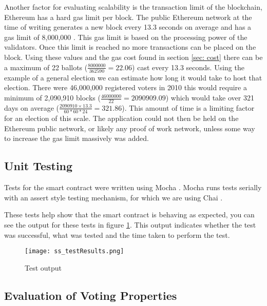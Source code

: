 \documentclass{entcs}
\begin{document}
Another factor for evaluating scalability is the transaction limit of the blockchain, Ethereum has a hard gas limit per block. The public Ethereum network at the time of writing generates a new block every 13.3 seconds on average \cite{ethscan} and has a gas limit of 8,000,000 \cite{gaslimit}. This gas limit is based on the processing power of the validators. Once this limit is reached no more transactions can be placed on the block. Using these values and the gas cost found in section \ref{sec: cost} there can be a maximum of 22 ballots (\(\frac{8000000}{362590}=22.06\)) cast every 13.3 seconds. Using the example of a general election we can estimate how long it would take to host that election. There were 46,000,000 registered voters in 2010 \cite{costOfGE} this would require a minimum of 2,090,910 blocks (\(\frac{46000000}{22}=2090909.09\)) which would take over 321 days on average (\(\frac{2090910 \times 13.3}{60*60*24}=321.86\)). This amount of time is a limiting factor for an election of this scale. The application could not then be held on the Ethereum public network, or likely any proof of work network, unless some way to increase the gas limit massively was added.

\subsection{Unit Testing}
Tests for the smart contract were written using Mocha \cite{mocha}. Mocha runs tests serially with an assert style testing mechanism, for which we are using Chai \cite{chai}.

These tests help show that the smart contract is behaving as expected, you can see the output for these tests in figure \ref{fig:testResults}. This output indicates whether the test was successful, what was tested and the time taken to perform the test.

\begin{figure}[h!]
    \centering
    \texttt{[image: ss\_testResults.png]}
    \caption{Test output}
    \label{fig:testResults}
\end{figure}




\subsection{Evaluation of Voting Properties}\label{sec: Eval}
\end{document}

